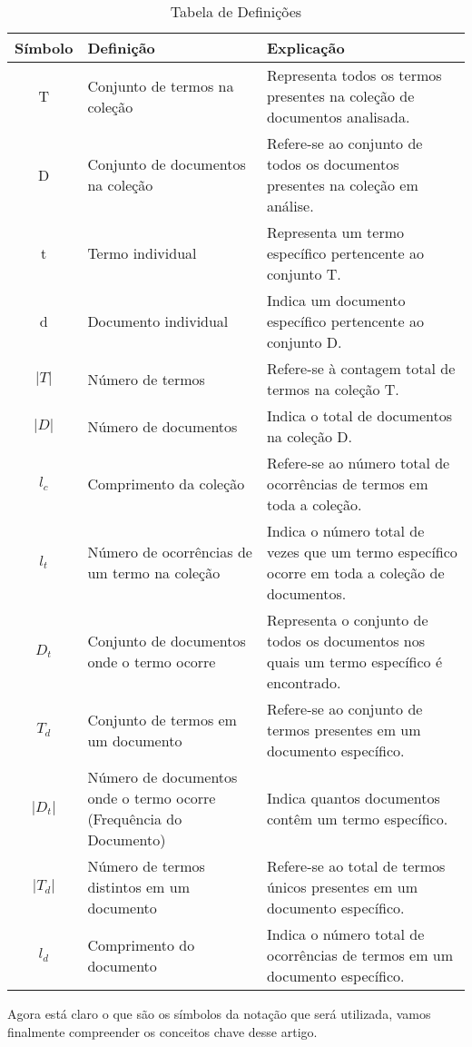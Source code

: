 \documentclass[runningheads]{llncs}
\begin{document}
\begin{table}[H]
\centering
\begin{tabular}{|c|p{5cm}|p{6cm}|}
\hline
Símbolo & Definição & Explicação \\
\hline
T & Conjunto de termos na coleção & Representa todos os termos presentes na coleção de documentos analisada. \\
D & Conjunto de documentos na coleção & Refere-se ao conjunto de todos os documentos presentes na coleção em análise. \\
t & Termo individual & Representa um termo específico pertencente ao conjunto T. \\
d & Documento individual & Indica um documento específico pertencente ao conjunto D. \\
$\vert T \vert$ & Número de termos & Refere-se à contagem total de termos na coleção T. \\
$\vert D \vert$ & Número de documentos & Indica o total de documentos na coleção D. \\
$l_c$ & Comprimento da coleção & Refere-se ao número total de ocorrências de termos em toda a coleção. \\
$l_t$ & Número de ocorrências de um termo na coleção & Indica o número total de vezes que um termo específico ocorre em toda a coleção de documentos. \\
$D_t$ & Conjunto de documentos onde o termo ocorre & Representa o conjunto de todos os documentos nos quais um termo específico é encontrado. \\
$T_d$ & Conjunto de termos em um documento & Refere-se ao conjunto de termos presentes em um documento específico. \\
$\vert D_t \vert$ & Número de documentos onde o termo ocorre (Frequência do Documento) & Indica quantos documentos contêm um termo específico. \\
$\vert T_d \vert$ & Número de termos distintos em um documento & Refere-se ao total de termos únicos presentes em um documento específico. \\
$l_d$ & Comprimento do documento & Indica o número total de ocorrências de termos em um documento específico. \\
\hline
\end{tabular}
\caption{Tabela de Definições}
\label{tab:definicoes}
\end{table}

Agora está claro o que são os símbolos da notação que será utilizada, vamos finalmente compreender os conceitos chave desse artigo.
\end{document}
